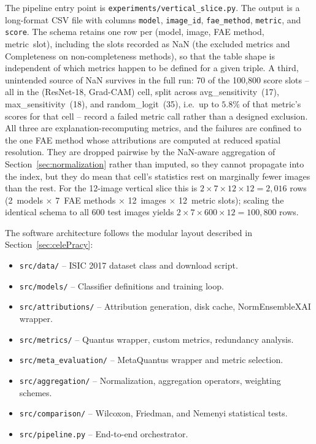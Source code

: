 The pipeline entry point is \texttt{experiments/vertical\_slice.py}. The
output is a long-format CSV file with columns \texttt{model},
\texttt{image\_id}, \texttt{fae\_method}, \texttt{metric}, and \texttt{score}.
The schema retains one row per (model, image, FAE method, metric~slot),
including the slots recorded as NaN (the excluded metrics and Completeness on
non-completeness methods), so that the table shape is independent of which
metrics happen to be defined for a given triple. A third, unintended source
of NaN survives in the full run: 70 of the 100{,}800 score slots -- all in
the (ResNet-18, Grad-CAM) cell, split across avg\_sensitivity~(17),
max\_sensitivity~(18), and random\_logit~(35), i.e.\ up to $5.8\%$ of that
metric's scores for that cell -- record a failed metric call rather than a
designed exclusion. All three are explanation-recomputing metrics, and the
failures are confined to the one FAE method whose attributions are
computed at reduced spatial resolution. They are dropped pairwise by the
NaN-aware aggregation of Section~\ref{sec:normalization} rather than
imputed, so they cannot propagate into the index, but they do mean that
cell's statistics rest on marginally fewer images than the rest. For the 12-image vertical
slice this is $2 \times 7 \times 12 \times 12 = 2{,}016$ rows (2~models
$\times$ 7~FAE methods $\times$ 12~images $\times$ 12~metric slots); scaling
the identical schema to all 600 test images yields
$2 \times 7 \times 600 \times 12 = 100{,}800$ rows.

The software architecture follows the modular layout described in
Section~\ref{sec:celePracy}:
\begin{itemize}
    \item \texttt{src/data/} -- ISIC 2017 dataset class and download script.
    \item \texttt{src/models/} -- Classifier definitions and training loop.
    \item \texttt{src/attributions/} -- Attribution generation, disk cache,
    NormEnsembleXAI wrapper.
    \item \texttt{src/metrics/} -- Quantus wrapper, custom metrics,
    redundancy analysis.
    \item \texttt{src/meta\_evaluation/} -- MetaQuantus wrapper and metric
    selection.
    \item \texttt{src/aggregation/} -- Normalization, aggregation operators,
    weighting schemes.
    \item \texttt{src/comparison/} -- Wilcoxon, Friedman, and Nemenyi
    statistical tests.
    \item \texttt{src/pipeline.py} -- End-to-end orchestrator.
\end{itemize}

